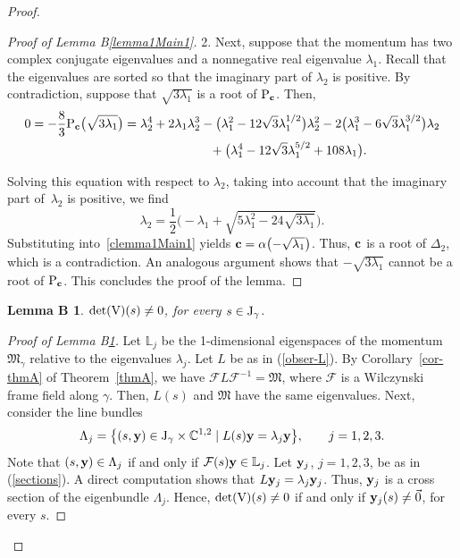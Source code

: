 \documentclass[pdftex]{sigma}
\numberwithin{equation}{section}
\newtheorem{lemmaB}{Lemma B\ignorespaces}
\def\C{\mathbb{C}}
\begin{document}
\begin{proof}
\begin{proof}[Proof of Lemma B\ref{lemma1Main1}]
2. Next, suppose that the momentum has two complex conjugate eigenvalues and a nonnegative real
eigenvalue $\lambda_1$.
Recall that the eigenvalues are sorted so that the imaginary part of $\lambda_2$ is positive. By contradiction,
suppose that $\sqrt{3\lambda_1}$ is a root of ${\rm P}_{{\bf c}}$. Then,
 \begin{gather*}
 0=-\frac{8}{3}{\rm P}_{{\bf c}}\big(\sqrt{3\lambda_1}\big) =\lambda_2^4+2\lambda_1\lambda_2^3-\big(\lambda_1^2-12\sqrt{3}\lambda_1^{1/2}\big)\lambda_2^2-2\big(\lambda_1^3-6\sqrt{3}\lambda_1^{3/2}\big)\lambda_2\\
\hphantom{0=-\frac{8}{3}{\rm P}_{{\bf c}}\big(\sqrt{3\lambda_1}\big)=}{}
+\big(\lambda_1^4-12\sqrt{3}\lambda_1^{5/2}+108\lambda_1\big).
\end{gather*}

Solving this equation with respect to $\lambda_2$, taking into account that the imaginary part of~$\lambda_2$ is positive,
we find
\[
 \lambda_2=\frac{1}{2}\biggl(-\lambda_1+\sqrt{5\lambda_1^2-24\sqrt{3\lambda_1}}\biggr).
\]
Substituting into~\eqref{clemma1Main1} yields ${\bf c}=\alpha\bigl(-\sqrt{\lambda_1}\bigr)$. Thus, ${\bf c}$ is a root of $\Delta_2$,
which is a contradiction. An analogous argument shows that $-\sqrt{3\lambda_1}$ cannot be a root of ${\rm P}_{{\bf c}}$.
This concludes the proof of the lemma.
\end{proof}

\begin{lemmaB}\label{lemma2Main1}
${\rm{det}}({\rm V})(s)\neq 0$, for every $s\in {\rm J}_{\gamma}$.
\end{lemmaB}

\begin{proof}[Proof of Lemma B\ref{lemma2Main1}]
Let ${\mathbb L}_j$ be the 1-dimensional eigenspaces of the momentum
${\mathfrak M}_{\gamma}$ relative to the eigenvalues $\lambda_j$.
Let $L$ be as in (\ref{obser-L}). By Corollary~\ref{cor-thmA} of Theorem~\ref{thmA},
we have ${{\mathcal F} L {\mathcal F}^{-1}={\mathfrak M}}$,
where ${\mathcal F}$ is a
Wilczynski
frame field along $\gamma$.
Then,
${L}(s)$ and ${\mathfrak M}$ have the same eigenvalues. Next, consider the line bundles
\[
 \Lambda_j=\big\{(s,{\bf y})\in {\rm J}_{\gamma}\times \C^{1,2} \mid {L}(s){\bf y}=\lambda_j{\bf y}\big\},\qquad j=1,2,3.
\]
Note that $(s,{\bf y})\in \Lambda_j$ if and only if ${\mathcal F}(s){\bf y}\in {\mathbb L}_j$. Let ${\bf y}_j$, $j=1,2,3$,
be as in (\ref{sections}). A direct computation shows that ${L}{\bf y}_j=\lambda_j {\bf y}_j$. Thus,
${\bf y}_j$
is a cross section of the eigenbundle $\Lambda_j$. Hence, ${\rm{det}}({\rm V})(s)\neq 0$ if and only if
 ${\bf y}_j(s)\neq \vec{0}$, for every $s$.


\end{proof}
\end{proof}
\end{document}
